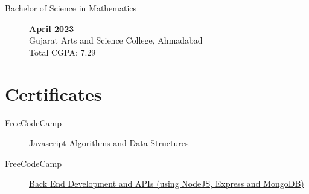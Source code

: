 \documentclass[a4paper,10pt]{article}
\begin{document}
\begin{description}
    \item[Bachelor of Science in Mathematics ] \hfill  \textbf{April 2023} \\
        Gujarat Arts and Science College, Ahmadabad
        \\ Total CGPA\@: 7.29
\end{description}

\section{Certificates}
\begin{description}
    \item[FreeCodeCamp]
        \href{https://www.freecodecamp.org/certification/jaydamani/javascript-algorithms-and-data-structures}{
            Javascript Algorithms and Data Structures
        }
    \item[FreeCodeCamp]
        \href{https://www.freecodecamp.org/certification/jaydamani/back-end-development-and-apis}{
            Back End Development and APIs (using NodeJS, Express and MongoDB)
        }
\end{description}
\end{document}

